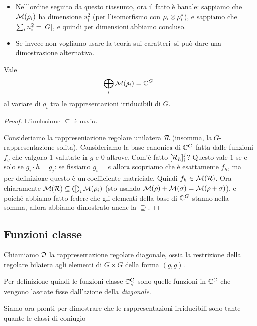	\begin{itemize}
	 \item Nell'ordine seguito da questo riassunto, ora il fatto è banale: sappiamo che $\mathcal M(\rho_i)$ ha dimensione $n_i^2$ (per l'isomorfismo con $\rho_i \otimes \rho_i^*$), e sappiamo che $\sum_i n_i^2 = \left|G\right|$, e quindi per dimensioni abbiamo concluso.
	 \item Se invece non vogliamo usare la teoria sui caratteri, si può dare una dimostrazione alternativa.
	\end{itemize}
	
	\begin{myprop}\label{prop:MatElDirSum}
		Vale
		\[
			\bigoplus_i \mathcal M(\rho_i) = \mathbb C^{G}
		\]
		al variare di $\rho_i$ tra le rappresentazioni irriducibili di $G$.
	\end{myprop}
	\begin{proof}
		L'inclusione $\subseteq$ è ovvia.
		
		Consideriamo la rappresentazione regolare unilatera $\mathcal R$ (insomma, la $G$-rappresentazione solita). Consideriamo la base canonica di $\mathbb C^{G}$ fatta dalle funzioni $f_g$ che valgono $1$ valutate in $g$ e $0$ altrove. Com'è fatto $[\mathcal R_h]_i^j$? Questo vale $1$ se e solo se $g_i\cdot h = g_j$: se fissiamo $g_i=e$ allora scopriamo che è esattamente $f_h$, ma per definizione questo è un coefficiente matriciale. Quindi $f_h\in \mathcal M(\mathcal R)$. Ora chiaramente $\mathcal M(\mathcal R) \subseteq \bigoplus_i \mathcal M(\rho_i)$ (sto usando $\mathcal M(\rho)+\mathcal M(\sigma)=\mathcal M(\rho+\sigma)$), e poiché abbiamo fatto federe che gli elementi della base di $\mathbb C^{G}$ stanno nella somma, allora abbiamo dimostrato anche la $\supseteq$.
	\end{proof}
	
	\subsection{Funzioni classe}
		\begin{mydef}
			Chiamiamo $\mathcal D$ la rappresentazione regolare diagonale, ossia la restrizione della regolare bilatera agli elementi di $G\times G$ della forma $(g,g)$.
		\end{mydef}
		Per definizione quindi le funzioni classe $\mathbb C^{G}_\#$ sono quelle funzioni in $\mathbb C^{G}$ che vengono lasciate fisse dall'azione della \emph{diagonale}. 
		
		Siamo ora pronti per dimostrare che le rappresentazioni irriducibili sono tante quante le classi di coniugio.
		
